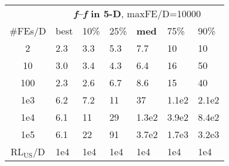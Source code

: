 \begin{tabular}{c|llllll}
 & \multicolumn{6}{|c}{\textbf{\textit{f}\raisebox{-0.35ex}{1}--\textit{f}\raisebox{-0.35ex}{24} in 5-D}, maxFE/D=10000}\\
\#FEs/D & best & 10\% & 25\% & \textbf{med} & 75\% & 90\%\\
2 & \hspace*{1ex}2.3 & \hspace*{1ex}3.3 & \hspace*{1ex}5.3 & \hspace*{1ex}7.7 & 10 & 10\\
10 & \hspace*{1ex}3.0 & \hspace*{1ex}3.4 & \hspace*{1ex}4.3 & \hspace*{1ex}6.4 & 16 & 50\\
100 & \hspace*{1ex}2.3 & \hspace*{1ex}2.6 & \hspace*{1ex}6.7 & \hspace*{1ex}8.6 & 15 & 40\\
1e3 & \hspace*{1ex}6.2 & \hspace*{1ex}7.2 & 11 & 37 & 1.1e2 & 2.1e2\\
1e4 & \hspace*{1ex}6.1 & 11 & 29 & 1.3e2 & 3.9e2 & 8.4e2\\
1e5 & \hspace*{1ex}6.1 & 22 & 91 & 3.7e2 & 1.7e3 & 3.2e3\\
$\text{RL}_{\text{US}}$/D & 1e4 & 1e4 & 1e4 & 1e4 & 1e4 & 1e4
\end{tabular}
